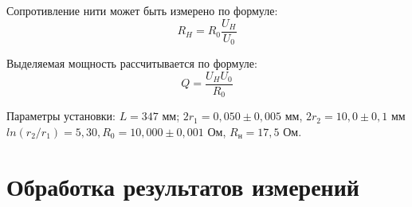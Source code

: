 \documentclass[12pt,a4paper]{article}
\begin{document}
Сопротивление нити может быть измерено по формуле:
\begin{equation}
	\label{eq:rniti}
	R_H = R_0 \frac{U_H}{U_0}
\end{equation}

Выделяемая мощность рассчитывается по формуле:
\begin{equation}
	\label{eq:q_eq}
Q = \frac{U_H U_0}{R_0}
\end{equation}


Параметры установки:
$L = 347$ мм; $2r_1 = 0,050 \pm 0,005$ мм, $2r_2 = 10,0 \pm 0,1$ мм $ln(r_2/r_1) = 5,30, R_0 = 10,000 \pm 0,001$ Ом, $R_н = 17,5$ Ом.

\section{Обработка результатов измерений}
\end{document}
